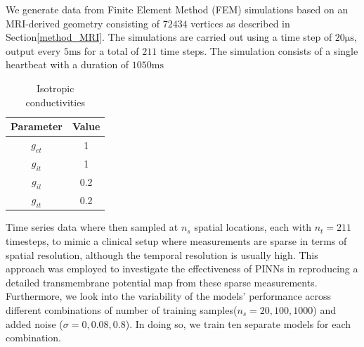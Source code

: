 We generate data from Finite Element Method (FEM) simulations based on an MRI-derived geometry consisting of $72434$ vertices as described in Section\ref{method_MRI}. The simulations are carried out using a time step of $20\mathrm{\mu s}$, output every $5\mathrm{ms}$ for a total of $211$ time steps. The simulation consists of a single heartbeat with a duration of $1050\mathrm{ms}$

\begin{table}[h]
  \centering
  \begin{tabular}{|c|c|}
    \hline
    Parameter & Value \\ \hline
    $g_{et}$ & 1 \\ \hline
    $g_{it}$ & 1 \\ \hline
    $g_{il}$ & 0.2 \\ \hline
    $g_{it}$ & 0.2 \\ \hline
  \end{tabular}
  \caption{Isotropic conductivities}
  \label{tab:Isotropic}
\end{table}

Time series data where then sampled at \(n_s\) spatial locations, each with \(n_t = 211\) timesteps, to mimic a clinical setup where measurements are sparse in terms of spatial resolution, although the temporal resolution is usually high. This approach was employed to investigate the effectiveness of PINNs in reproducing a detailed transmembrane potential map from these sparse measurements. Furthermore, we look into the variability of the models' performance across different combinations of number of training samples($n_s=20,100,1000$) and added noise ($\sigma=0,0.08,0.8$). In doing so, we train ten separate models for each combination.



